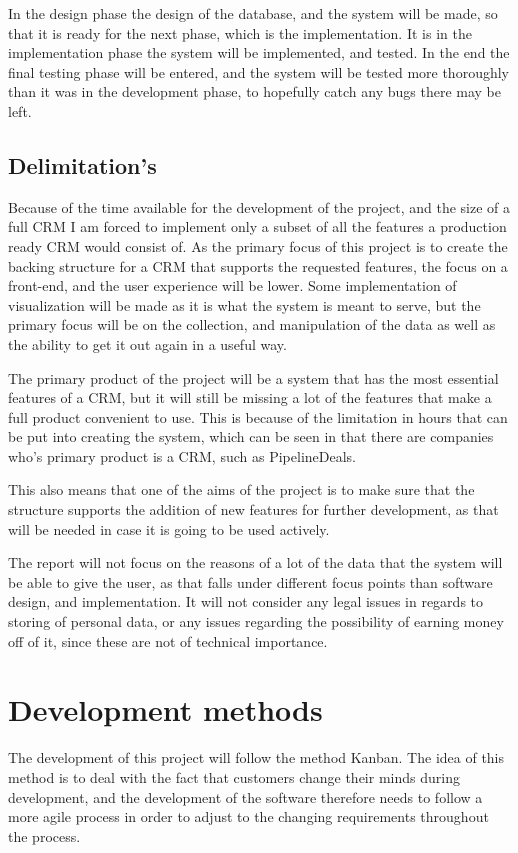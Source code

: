 In the design phase the design of the database, and the system will be made, so
that it is ready for the next phase, which is the implementation. It is in the
implementation phase the system will be implemented, and tested. In the end the
final testing phase will be entered, and the system will be tested more
thoroughly than it was in the development phase, to hopefully catch any bugs
there may be left. 

\subsection{Delimitation's}
\label{sub:Delimitations}
Because of the time available for the development of the project, and the size
of a full CRM I am forced to implement only a subset of all the features a
production ready CRM would consist of. As the primary focus of this project is
to create the backing structure for a CRM that supports the requested features,
the focus on a front-end, and the user experience will be lower. Some
implementation of visualization will be made as it is what the system is meant
to serve, but the primary focus will be on the collection, and manipulation of
the data as well as the ability to get it out again in a useful way. 

The primary product of the project will be a system that has the most essential
features of a CRM, but it will still be missing a lot of the features that make
a full product convenient to use. This is because of the limitation in hours
that can be put into creating the system, which can be seen in that there are
companies who's primary product is a CRM, such as PipelineDeals. 

This also means that one of the aims of the project is to make sure that the
structure supports the addition of new features for further development, as that
will be needed in case it is going to be used actively. 

The report will not focus on the reasons of a lot of the data that the system
will be able to give the user, as that falls under different focus points than
software design, and implementation. It will not consider any legal issues in
regards to storing of personal data, or any issues regarding the possibility of
earning money off of it, since these are not of technical importance. 

\section{Development methods}
\label{sec:Development methods}
The development of this project will follow the method Kanban. The idea of this
method is to deal with the fact that customers change their minds during
development, and the development of the software therefore needs to follow a
more agile process in order to adjust to the changing requirements throughout
the process. 

